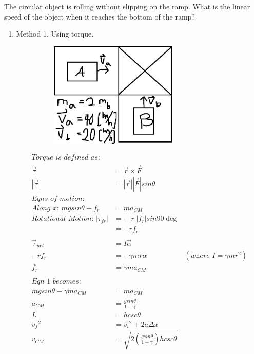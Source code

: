 \documentclass{article}
\begin{document}
\begin{enumerate}
            The circular object is rolling without slipping on the ramp. What is the linear speed of the object when it reaches the bottom of the ramp?
            \begin{enumerate}
                \item Method 1. Using torque.
                \begin{center}\includegraphics[width=10cm, height=5cm]{3.PNG}\end{center}
                \begin{align*}
                    \textit{Torque is defined as:} \\
                    \vec{\tau}&=\vec{r}\times\vec{F} \\
                    |\vec{\tau}|&=|\vec{r}||\vec{F}|sin\theta \\
                    \textit{Eqns of motion:} \\
                    \textit{Along x: } mgsin\theta-f_r&=ma_{CM} \\
                    \textit{Rotational Motion: } |\tau_{fr}|&=-|r||f_r|sin90\deg \\
                    &=-rf_r \\\\
                    \vec{\tau}_{net}&=I\vec{\alpha} \\
                    -rf_r&=-\gamma mr\alpha &(\textit{where } I=\gamma mr^2)\\
                    f_r&=\gamma ma_{CM} \\\\
                    \textit{Eqn 1 becomes:} \\
                    mgsin\theta-\gamma ma_{CM}&=ma_{CM} \\
                    a_{CM}&=\frac{gsin\theta}{1+\gamma} \\
                    L&=hcsc\theta \\
                    {v_f}^2&={v_i}^2+2a\Delta x \\
                    v_{CM}&=\sqrt{2(\frac{gsin\theta}{1+\gamma})hcsc\theta} \\

\end{align*}
\end{enumerate}
\end{enumerate}
\end{document}
